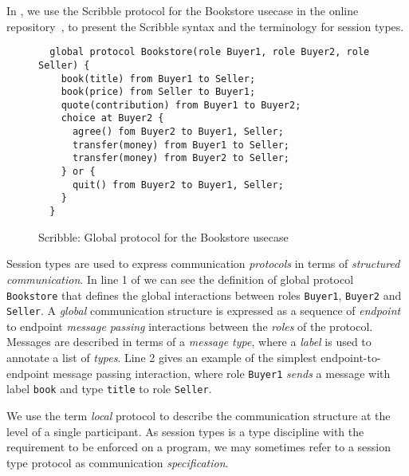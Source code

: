 In , we use the Scribble protocol for the
Bookstore usecase in the online repository~\cite{usecase_repository},
to present the Scribble syntax and the terminology for session types.

\begin{figure}[t]
\begin{lstlisting}
  global protocol Bookstore(role Buyer1, role Buyer2, role Seller) {
    book(title) from Buyer1 to Seller;
    book(price) from Seller to Buyer1;
    quote(contribution) from Buyer1 to Buyer2;
    choice at Buyer2 {
      agree() fom Buyer2 to Buyer1, Seller;
      transfer(money) from Buyer1 to Seller;
      transfer(money) from Buyer2 to Seller;
    } or {
      quit() from Buyer2 to Buyer1, Seller;
    }
  }
\end{lstlisting}
\caption{Scribble: Global protocol for the Bookstore usecase}
\label{fig:scribble_bs}
\end{figure}



Session types are used to express communication
{\em protocols} in terms of {\em structured communication}.
In line 1 of  we can see the definition 
of global protocol \lstinline|Bookstore| that defines 
the global interactions between roles \lstinline|Buyer1|,
\lstinline|Buyer2| and \lstinline|Seller|.
A {\em global} communication structure is expressed 
as a sequence of {\em endpoint} to endpoint {\em message passing}
interactions between the {\em roles} of the protocol.
Messages are described in terms of a {\em message type},
where  a {\em label} is used to annotate a list
of {\em types}.
Line 2 gives an example of the simplest endpoint-to-endpoint message
passing interaction,
where role \lstinline|Buyer1| {\em sends} a message with
label \lstinline|book| and type \lstinline|title| to role
\lstinline{Seller}.


We use the term {\em local} protocol to describe
the communication structure at the level of a single participant.
As session types is a type discipline with the requirement to
be enforced on a program, we may sometimes refer to a session type
protocol as communication {\em specification}.

\begin{comment}
For example Scribble code:
%
\begin{lstlisting}
  msg(int) from A to B;
\end{lstlisting}
%
describes the global protocol between role \lstinline|A| and \lstinline|B|,
where participant \lstinline|A| sends message of type \lstinline|msg(int)|
to participant \lstinline|B|. From the local perspective of participant
\lstinline|A| the protocol would be:
%
\begin{lstlisting}
  msg(int) to B;
\end{lstlisting}
%
where it describes the sending of message \lstinline|msg(int)|
to participant \lstinline|B|.
\end{comment}

